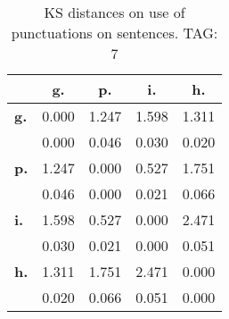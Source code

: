 \begin{table}[h!]
\begin{center}
\begin{tabular}{| l || c | c | c | c |}\hline
 & {\bf g.} & {\bf p.} & {\bf i.} & {\bf h.} \\\hline\hline
{\bf g.} & 0.000 & 1.247 & 1.598 & 1.311 \\
{\bf } & 0.000 & 0.046 & 0.030 & 0.020 \\\hline
{\bf p.} & 1.247 & 0.000 & 0.527 & 1.751 \\
{\bf } & 0.046 & 0.000 & 0.021 & 0.066 \\\hline
{\bf i.} & 1.598 & 0.527 & 0.000 & 2.471 \\
{\bf } & 0.030 & 0.021 & 0.000 & 0.051 \\\hline
{\bf h.} & 1.311 & 1.751 & 2.471 & 0.000 \\
{\bf } & 0.020 & 0.066 & 0.051 & 0.000 \\\hline
\end{tabular}
\caption{KS distances on use of punctuations on sentences. TAG: 7}
\end{center}
\end{table}